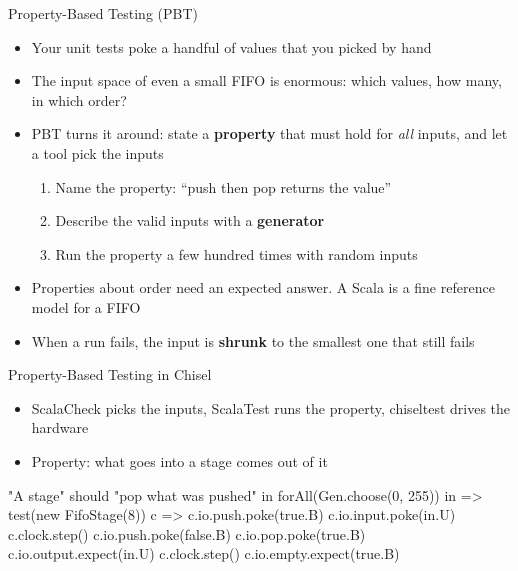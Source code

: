 \begin{frame}{Property-Based Testing (PBT)}
	\begin{itemize}
		\item Your unit tests poke a handful of values that you picked by hand
		\item The input space of even a small FIFO is enormous: which values, how many, in which order?
		\pause
		\item PBT turns it around: state a \textbf{property} that must hold for \emph{all} inputs,
		      and let a tool pick the inputs
		\begin{enumerate}
			\item Name the property: ``push then pop returns the value''
			\item Describe the valid inputs with a \textbf{generator}
			\item Run the property a few hundred times with random inputs
		\end{enumerate}
		\pause
		\item Properties about order need an expected answer.
		      A Scala  is a fine reference model for a FIFO
		\pause
		\item When a run fails, the input is \textbf{shrunk} to the smallest one that still fails
	\end{itemize}
\end{frame}

\begin{frame}[fragile]{Property-Based Testing in Chisel}
	\begin{itemize}
		\item ScalaCheck picks the inputs, ScalaTest runs the property, chiseltest drives the hardware
		\item Property: what goes into a stage comes out of it
	\end{itemize}
	\begin{chisel}[basicstyle=\scriptsize\ttfamily, aboveskip=1mm, belowskip=0mm]
"A stage" should "pop what was pushed" in {
  forAll(Gen.choose(0, 255)) { in =>
    test(new FifoStage(8)) { c =>
      c.io.push.poke(true.B)
      c.io.input.poke(in.U)
      c.clock.step()
      c.io.push.poke(false.B)
      c.io.pop.poke(true.B)
      c.io.output.expect(in.U)
      c.clock.step()
      c.io.empty.expect(true.B)
    }
  }
}
	\end{chisel}
\end{frame}

